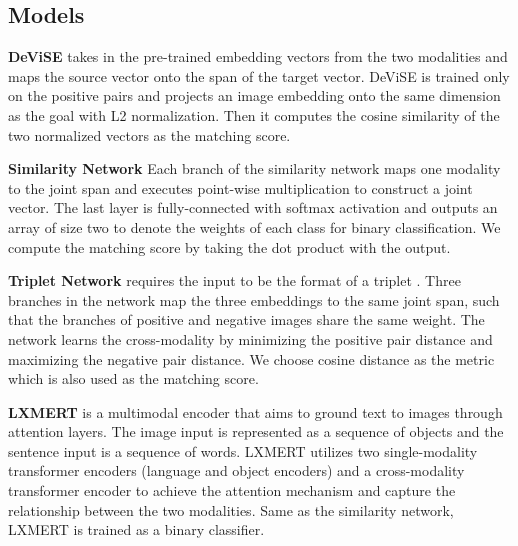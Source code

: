 \documentclass[11pt]{article}
\begin{document}
\subsection{Models}

\noindent
\textbf{DeViSE} takes in the pre-trained embedding vectors from the two modalities and maps the source vector onto the span of the target vector. DeViSE is trained only on the positive pairs   and projects an image embedding onto the same dimension as the goal with L2 normalization. Then it computes the cosine similarity of the two normalized vectors as the matching score.

\noindent
\textbf{Similarity Network} Each branch of the similarity network maps one modality to the joint span and executes point-wise multiplication to construct a joint vector. The last layer is fully-connected with softmax activation and outputs an array of size two to denote the weights of each class for binary classification. We compute the matching score by taking the dot product  with the output.

\noindent
\textbf{Triplet Network} requires the input to be the format of a triplet . Three branches in the network map the three embeddings to the same joint span, such that the branches of positive and negative images share the same weight. The network learns the cross-modality by minimizing the positive pair distance and maximizing the negative pair distance. We choose cosine distance as the metric which is also used as the matching score.

\noindent
\textbf{LXMERT} is a multimodal encoder that aims to ground text to images through attention layers. The image input is represented as a sequence of objects and the sentence input is a sequence of words. LXMERT utilizes two single-modality transformer encoders (language and object encoders) and a cross-modality transformer encoder to achieve the attention mechanism and capture the relationship between the two modalities. Same as the similarity network, LXMERT is trained as a binary classifier.
\end{document}
